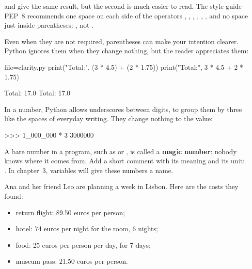 
 and  give the same result, but the second is much easier to read. The style
guide PEP~8 recommends one space on each side of the operators \py{+}, \py{-}, \py{*}, \py{/},
\py{//}, \py{\%}, and no space just inside parentheses: , not .

Even when they are not required, parentheses can make your intention clearer. Python ignores them
when they change nothing, but the reader appreciates them:

\begin{code}{file=clarity.py}
print("Total:", (3 * 4.5) + (2 * 1.75))
print("Total:", 3 * 4.5 + 2 * 1.75)
\end{code}
\begin{sortie}
Total: 17.0
Total: 17.0
\end{sortie}

In a number, Python allows underscores \py{\_} between digits, to group them by three like the
spaces of everyday writing. They change nothing to the value:

\begin{console}
>>> 1_000_000 * 3
3000000
\end{console}

\begin{pratique}
A bare number in a program, such as  or , is called a \textbf{magic number}:
nobody knows where it comes from. Add a short comment with its meaning and its unit:
. In chapter~3, variables will give these numbers a name.
\end{pratique}


Ana and her friend Leo are planning a week in Lisbon. Here are the costs they found:

\begin{tcolorbox}[otBase,colback=otGreenTint,colframe=otGreenTint,left=5mm]
\begin{itemize}
\item return flight: 89.50 euros per person;
\item hotel: 74 euros per night for the room, 6 nights;
\item food: 25 euros per person per day, for 7 days;
\item museum pass: 21.50 euros per person.
\end{itemize}
\end{tcolorbox}

